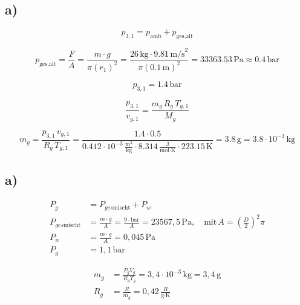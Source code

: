 

\subsection*{a)}

\[
p_{3,1} = p_{\text{amb}} + p_{\text{ges,alt}}
\]

\[
p_{\text{ges,alt}} = \frac{F}{A} = \frac{m \cdot g}{\pi (r_1)^2} = \frac{26 \, \text{kg} \cdot 9.81 \, \text{m/s}^2}{\pi \left(0.1 \, \text{m}\right)^2} = 33363.53 \, \text{Pa} \approx 0.4 \, \text{bar}
\]

\[
p_{3,1} = 1.4 \, \text{bar}
\]

\[
\frac{p_{3,1}}{v_{g,1}} = \frac{m_g \, R_g \, T_{g,1}}{M_g}
\]

\[
m_g = \frac{p_{3,1} \, v_{g,1}}{R_g \, T_{g,1}} = \frac{1.4 \cdot 0.5}{0.412 \cdot 10^{-3} \, \frac{\text{m}^3}{\text{kg}} \cdot 8.314 \, \frac{\text{J}}{\text{mol} \cdot \text{K}} \cdot 223.15 \, \text{K}} = 3.8 \, \text{g} = 3.8 \cdot 10^{-3} \, \text{kg}
\]



\subsection*{a)}
\begin{align*}
P_g &= P_{ges\text{mischt}} + P_w \\
P_{ges\text{mischt}} &= \frac{m \cdot g}{A} = \frac{9 \cdot \text{bar}}{A} = 23567,5 \, \text{Pa}, \quad \text{mit} \, A = \left( \frac{D}{2} \right)^2 \pi \\
P_w &= \frac{m \cdot g}{A} = 0,045 \, \text{Pa} \\
P_g &= 1,1 \, \text{bar}
\end{align*}

\begin{align*}
m_g &= \frac{P_g V_g}{R_g T_g} = 3,4 \cdot 10^{-3} \, \text{kg} = 3,4 \, \text{g} \\
R_g &= \frac{R}{m_g} = 0,42 \, \frac{R}{\text{g} \cdot \text{K}}
\end{align*}